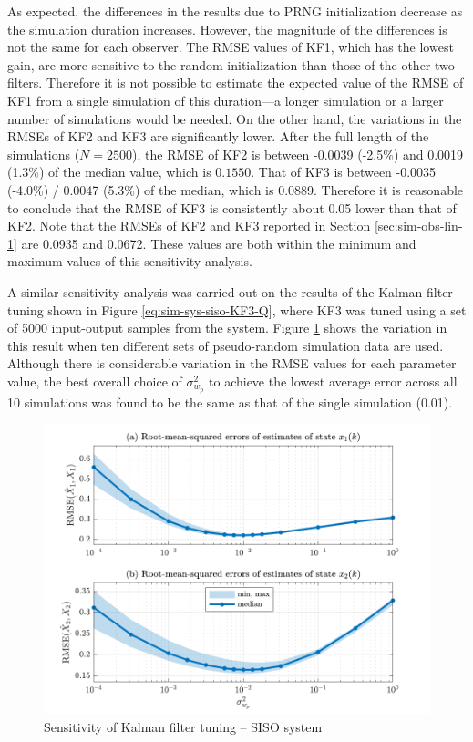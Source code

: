As expected, the differences in the results due to \gls{PRNG} initialization decrease as the simulation duration increases. However, the magnitude of the differences is not the same for each observer. The \gls{RMSE} values of KF1, which has the lowest gain, are more sensitive to the random initialization than those of the other two filters. Therefore it is not possible to estimate the expected value of the \gls{RMSE} of KF1 from a single simulation of this duration---a longer simulation or a larger number of simulations would be needed. On the other hand, the variations in the \gls{RMSE}s of KF2 and KF3 are significantly lower. After the full length of the simulations ($N=2500$), the \gls{RMSE} of KF2 is between -0.0039 (-2.5\%) and 0.0019 (1.3\%) of the median value, which is $0.1550$.  That of KF3 is between -0.0035 (-4.0\%) / 0.0047 (5.3\%) of the median, which is 0.0889.  Therefore it is reasonable to conclude that the \gls{RMSE} of KF3 is consistently about 0.05 lower than that of KF2. Note that the \gls{RMSE}s of KF2 and KF3 reported in Section \ref{sec:sim-obs-lin-1} are 0.0935 and 0.0672. These values are both within the minimum and maximum values of this sensitivity analysis.

A similar sensitivity analysis was carried out on the results of the Kalman filter tuning shown in Figure \ref{eq:sim-sys-siso-KF3-Q}, where KF3 was tuned using a set of 5000 input-output samples from the system. Figure \ref{fig:sim-sys-siso-KF3-sensitivity} shows the variation in this result when ten different sets of pseudo-random simulation data are used.  Although there is considerable variation in the \gls{RMSE} values for each parameter value, the best overall choice of $\sigma_{w_p}^2$ to achieve the lowest average error across all 10 simulations was found to be the same as that of the single simulation (0.01).
\begin{figure}[htp]
	\centering
	\includegraphics[width=14cm]{images/rod_obs_sim1_3KF_Q_statplot.pdf}
	\caption{Sensitivity of Kalman filter tuning – SISO system}
	\label{fig:sim-sys-siso-KF3-sensitivity}
\end{figure}

